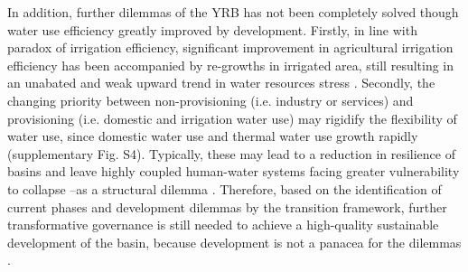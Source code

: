 \documentclass[9pt, twocolumn, twoside, lineno]{pnas-new}
\begin{document}
In addition, further dilemmas of the YRB has not been completely solved though water use efficiency greatly improved by development.
Firstly, in line with paradox of irrigation efficiency, significant improvement in agricultural irrigation efficiency has been accompanied by re-growths in irrigated area, still resulting in an unabated and weak upward trend in water resources stress \cite{graftonParadoxIrrigationEfficiency2018}.
Secondly, the changing priority between non-provisioning (i.e. industry or services) and provisioning (i.e. domestic and irrigation water use) may rigidify the flexibility of water use, since domestic water use and thermal water use growth rapidly (supplementary Fig. S4). 
Typically, these may lead to a reduction in resilience of basins and leave highly coupled human-water systems facing greater vulnerability to collapse --as a structural dilemma \cite{cummingResilienceBigRiver2011}. Therefore, based on the identification of current phases and development dilemmas by the transition framework, further transformative governance is still needed to achieve a high-quality sustainable development of the basin, because development is not a panacea for the dilemmas \cite{scoonesTransformationsSustainabilityCombining2020a}.
\end{document}
